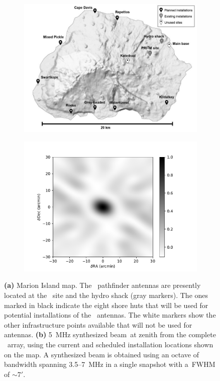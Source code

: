 \begin{figure}
	\centering
	\begin{subfigure}[t]{0.5\textwidth}
		\centering
		\includegraphics[width=\linewidth]{Figures/marion_map_annotated.jpg} 
		\caption{} \label{Fig:marion_map}
	\end{subfigure}
	\hfill
	\begin{subfigure}[t]{0.49\textwidth}
		\centering
		\includegraphics[width=\linewidth]{Figures/marion_beam_huts_2020}
		\caption{} \label{Fig:marion_beam}
	\end{subfigure}
	\caption{{\bf (a)} Marion Island map.  The \albatros\ pathfinder antennas are presently located at the \prizm\ site and the hydro shack (gray markers). The ones marked in black indicate the eight shore huts that will be used for potential installations of the \albatros\ antennas.  The white markers show the other infrastructure points available that will not be used for antennas. {\bf (b)} 5~MHz synthesized beam at zenith from the complete \albatros\ array, using the current and scheduled installation locations shown on the map.  A synthesized beam is obtained using an octave of bandwidth spanning 3.5--7~MHz in a single snapshot with a FWHM of $\sim7'$.}
	\label{Fig:marion_map_beam}
\end{figure}

